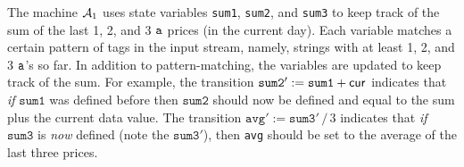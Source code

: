 The machine $\mathcal{A}_1$ uses state variables \texttt{sum1}, \texttt{sum2}, and \texttt{sum3} to keep track of the sum of the last 1, 2, and 3 $\texttt{a}$ prices (in the current day). Each variable matches a certain pattern of tags in the input stream, namely, strings with at least 1, 2, and 3 $\texttt{a}$'s so far.
In addition to pattern-matching, the variables are updated to keep track of the sum.
For example, the transition $\texttt{sum2}' := \texttt{sum1} + \mathsf{cur}$ indicates that \emph{if} $\texttt{sum1}$ was defined before then $\texttt{sum2}$ should now be defined and equal to the sum plus the current data value. The transition $\texttt{avg}' := \texttt{sum3}'\,/\,3$ indicates that \emph{if} $\texttt{sum3}$ is \emph{now} defined (note the $\texttt{sum3}'$), then \texttt{avg} should be set to the average of the last three prices.

